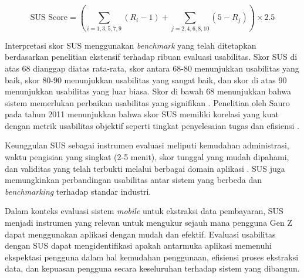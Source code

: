\begin{equation}
    \label{eq:sus-score}
\text{SUS Score} = \left(\sum_{i=1,3,5,7,9} (R_i - 1) + \sum_{j=2,4,6,8,10} (5 - R_j)\right) \times 2.5
\end{equation}

Interpretasi skor SUS menggunakan \emph{benchmark} yang telah ditetapkan berdasarkan penelitian ekstensif terhadap ribuan evaluasi usabilitas. Skor SUS di atas 68 dianggap diatas rata-rata, skor antara 68-80 menunjukkan usabilitas yang baik, skor 80-90 menunjukkan usabilitas yang sangat baik, dan skor di atas 90 menunjukkan usabilitas yang luar biasa. Skor di bawah 68 menunjukkan bahwa sistem memerlukan perbaikan usabilitas yang signifikan \parencite{bangor2009determining}. Penelitian oleh Sauro pada tahun 2011 menunjukkan bahwa skor SUS memiliki korelasi yang kuat dengan metrik usabilitas objektif seperti tingkat penyelesaian tugas dan efisiensi \parencite{sauro2011measuring}.

Keunggulan SUS sebagai instrumen evaluasi meliputi kemudahan administrasi, waktu pengisian yang singkat (2-5 menit), skor tunggal yang mudah dipahami, dan validitas yang telah terbukti melalui berbagai domain aplikasi \parencite{lewis2018sus}. SUS juga memungkinkan perbandingan usabilitas antar sistem yang berbeda dan \emph{benchmarking} terhadap standar industri.

Dalam konteks evaluasi sistem \emph{mobile} untuk ekstraksi data pembayaran, SUS menjadi instrumen yang relevan untuk mengukur sejauh mana pengguna Gen Z dapat menggunakan aplikasi dengan mudah dan efektif. Evaluasi usabilitas dengan SUS dapat mengidentifikasi apakah antarmuka aplikasi memenuhi ekspektasi pengguna dalam hal kemudahan penggunaan, efisiensi proses ekstraksi data, dan kepuasan pengguna secara keseluruhan terhadap sistem yang dibangun.
